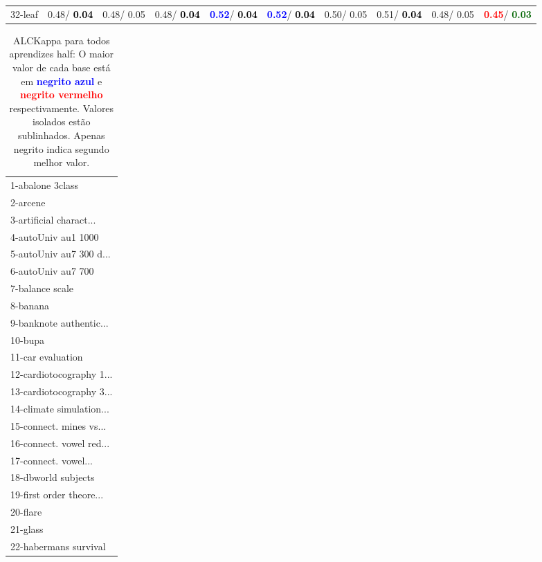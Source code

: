 \begin{table}[h]
\begin{center}
{\begin{tabular}{lc|c|c|c|c|c|c|c|c}
32-leaf &   0.48/\textcolor{black}{\textbf{  0.04}} &   0.48/  0.05 &   0.48/\textcolor{black}{\textbf{  0.04}} & \textcolor{blue}{\textbf{  0.52}}/\textcolor{black}{\textbf{  0.04}} & \textcolor{blue}{\textbf{  0.52}}/\textcolor{black}{\textbf{  0.04}} &   0.50/  0.05 &   0.51/\textcolor{black}{\textbf{  0.04}} &   0.48/  0.05 & \textcolor{red}{\textbf{  0.45}}/\textcolor{darkgreen}{\textbf{  0.03}} \\\end{tabular}}\label{stratsALCKappa0Allalla}
\end{center}
\end{table}
\begin{table}[h]
\caption{ALCKappa para todos aprendizes half: O maior valor de cada base está em \textcolor{blue}{\textbf{negrito azul}} e \textcolor{red}{\textbf{negrito vermelho}} respectivamente. Valores isolados estão sublinhados. Apenas negrito indica segundo melhor valor.}
\begin{center}\begin{tabular}{l}
 & \\ \hline 1-abalone 3class &  \\
2-arcene &  \\
3-artificial charact... &  \\
4-autoUniv au1 1000 &  \\
5-autoUniv au7 300 d... &  \\
6-autoUniv au7 700 &  \\
7-balance scale &  \\ \hline
8-banana &  \\
9-banknote authentic... &  \\
10-bupa &  \\
11-car evaluation &  \\
12-cardiotocography 1... &  \\
13-cardiotocography 3... &  \\
14-climate simulation... &  \\ \hline
15-connect. mines vs... &  \\
16-connect. vowel red... &  \\
17-connect. vowel... &  \\
18-dbworld subjects &  \\
19-first order theore... &  \\
20-flare &  \\
21-glass &  \\ \hline
22-habermans survival &  \\

\end{tabular}
\end{center}
\end{table}
